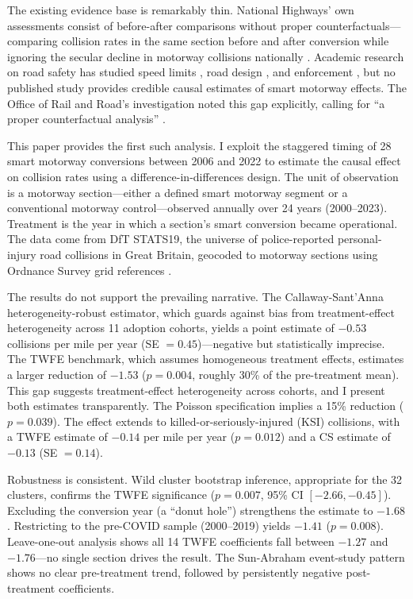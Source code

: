 \documentclass[12pt]{article}
\begin{document}
The existing evidence base is remarkably thin. National Highways' own assessments consist of before-after comparisons without proper counterfactuals---comparing collision rates in the same section before and after conversion while ignoring the secular decline in motorway collisions nationally \citep{national_highways_2023}. Academic research on road safety has studied speed limits \citep{aarts_driving_2006}, road design \citep{noland_2003}, and enforcement \citep{deangelo_police_2017}, but no published study provides credible causal estimates of smart motorway effects. The Office of Rail and Road's investigation noted this gap explicitly, calling for ``a proper counterfactual analysis'' \citep{orr_smart_2022}.

This paper provides the first such analysis. I exploit the staggered timing of 28 smart motorway conversions between 2006 and 2022 to estimate the causal effect on collision rates using a difference-in-differences design. The unit of observation is a motorway section---either a defined smart motorway segment or a conventional motorway control---observed annually over 24 years (2000--2023). Treatment is the year in which a section's smart conversion became operational. The data come from DfT STATS19, the universe of police-reported personal-injury road collisions in Great Britain, geocoded to motorway sections using Ordnance Survey grid references \citep{dft_stats19_2024}.

The results do not support the prevailing narrative. The Callaway-Sant'Anna heterogeneity-robust estimator, which guards against bias from treatment-effect heterogeneity across 11 adoption cohorts, yields a point estimate of $-0.53$ collisions per mile per year (SE $= 0.45$)---negative but statistically imprecise. The TWFE benchmark, which assumes homogeneous treatment effects, estimates a larger reduction of $-1.53$ ($p = 0.004$, roughly 30\% of the pre-treatment mean). This gap suggests treatment-effect heterogeneity across cohorts, and I present both estimates transparently. The Poisson specification implies a 15\% reduction ($p = 0.039$). The effect extends to killed-or-seriously-injured (KSI) collisions, with a TWFE estimate of $-0.14$ per mile per year ($p = 0.012$) and a CS estimate of $-0.13$ (SE $= 0.14$).

Robustness is consistent. Wild cluster bootstrap inference, appropriate for the 32 clusters, confirms the TWFE significance ($p = 0.007$, 95\% CI $[-2.66, -0.45]$). Excluding the conversion year (a ``donut hole'') strengthens the estimate to $-1.68$. Restricting to the pre-COVID sample (2000--2019) yields $-1.41$ ($p = 0.008$). Leave-one-out analysis shows all 14 TWFE coefficients fall between $-1.27$ and $-1.76$---no single section drives the result. The Sun-Abraham event-study pattern shows no clear pre-treatment trend, followed by persistently negative post-treatment coefficients.
\end{document}
